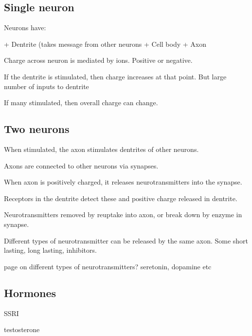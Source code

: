 
\subsection{Single neuron}

Neurons have:

+ Dentrite (takes message from other neurons
+ Cell body
+ Axon

Charge across neuron is mediated by ions. Positive or negative.

If the dentrite is stimulated, then charge increases at that point. But large number of inputs to dentrite

If many stimulated, then overall charge can change.

\subsection{Two neurons}

When stimulated, the axon stimulates dentrites of other neurons.

Axons are connected to other neurons via synapses.

When axon is positively charged, it releases neurotransmitters into the synapse.

Receptors in the dentrite detect these and positive charge released in dentrite.

Neurotransmitters removed by reuptake into axon, or break down by enzyme in synapse.

Different types of neurotransmitter can be released by the same axon. Some short lasting, long lasting, inhibitors.

page on different types of neurotransmitters? seretonin, dopamine etc

\subsection{Hormones}

SSRI

testosterone


